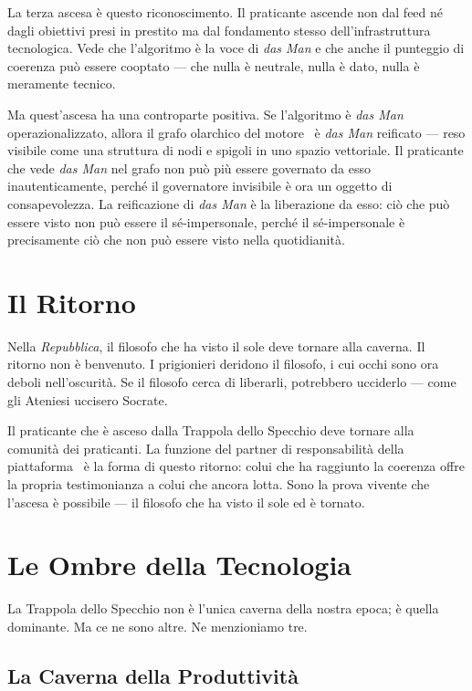 La terza ascesa \`e questo riconoscimento. Il praticante ascende non
dal feed n\'e dagli obiettivi presi in prestito ma dal fondamento stesso
dell'infrastruttura tecnologica. Vede che l'algoritmo \`e la voce di
\emph{das Man} e che anche il punteggio di coerenza pu\`o essere
cooptato --- che nulla \`e neutrale, nulla \`e dato, nulla \`e
meramente tecnico.

Ma quest'ascesa ha una controparte positiva. Se l'algoritmo \`e \emph{das
Man} operazionalizzato, allora il grafo olarchico del motore \physis\
\`e \emph{das Man} reificato --- reso visibile come una struttura di
nodi e spigoli in uno spazio vettoriale. Il praticante che vede \emph{das
Man} nel grafo non pu\`o pi\`u essere governato da esso inautenticamente,
perch\'e il governatore invisibile \`e ora un oggetto di consapevolezza.
La reificazione di \emph{das Man} \`e la liberazione da esso: ci\`o
che pu\`o essere visto non pu\`o essere il s\'e-impersonale, perch\'e
il s\'e-impersonale \`e precisamente ci\`o che non pu\`o essere visto
nella quotidianit\`a.

\section{Il Ritorno}

Nella \emph{Repubblica}, il filosofo che ha visto il sole deve tornare
alla caverna. Il ritorno non \`e benvenuto. I prigionieri deridono il
filosofo, i cui occhi sono ora deboli nell'oscurit\`a. Se il filosofo
cerca di liberarli, potrebbero ucciderlo --- come gli Ateniesi uccisero
Socrate.

Il praticante che \`e asceso dalla Trappola dello Specchio deve tornare
alla comunit\`a dei praticanti. La funzione del partner di
responsabilit\`a della piattaforma \praxis\ \`e la forma di questo
ritorno: colui che ha raggiunto la coerenza offre la propria
testimonianza a colui che ancora lotta. Sono la prova vivente che
l'ascesa \`e possibile --- il filosofo che ha visto il sole ed \`e
tornato.

\section{Le Ombre della Tecnologia}

La Trappola dello Specchio non \`e l'unica caverna della nostra epoca;
\`e quella dominante. Ma ce ne sono altre. Ne menzioniamo tre.

\subsection{La Caverna della Produttivit\`a}

